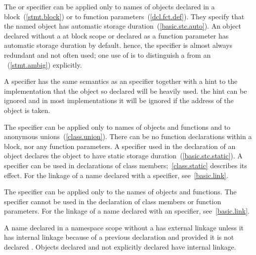 \pnum
{}%
%
The  or  specifier can be applied only to
names of objects declared in a block~(\ref{stmt.block}) or to function
parameters~(\ref{dcl.fct.def}). They specify that the named object has
automatic storage duration~(\ref{basic.stc.auto}). An object declared
without a  at block scope or declared
as a function parameter has automatic storage duration by default.
\enternote
hence, the  specifier is almost always redundant and not
often used; one use of  is to distinguish a
 from an
~(\ref{stmt.ambig}) explicitly.
\exitnoteb

\pnum
{}%
A  specifier has the same semantics as an 
specifier together with a hint to the implementation that the object
so declared will be heavily used.
\enternote
the hint can be ignored and in most implementations it will be ignored
if the address of the object is taken.
\exitnoteb

\pnum
{}%
The  specifier can be applied only to names of objects and
functions and to anonymous unions~(\ref{class.union}). There can be no
 function declarations within a block, nor any
 function parameters. A  specifier used in
the declaration of an object declares the object to have static storage
duration~(\ref{basic.stc.static}). A  specifier can be
used in declarations of class members;~\ref{class.static} describes its
effect.
%
For the linkage of a name declared with a  specifier,
see~\ref{basic.link}.

\pnum
{}%
The  specifier can be applied only to the names of objects
and functions. The  specifier cannot be used in the
declaration of class members or function parameters.
%
%
For the linkage of a name declared with an  specifier,
see~\ref{basic.link}.

\pnum
{}%
%
A name declared in a namespace scope without a
 has external linkage unless it has
internal linkage because of a previous declaration and provided it is
not declared . Objects declared  and not
explicitly declared  have internal linkage.


